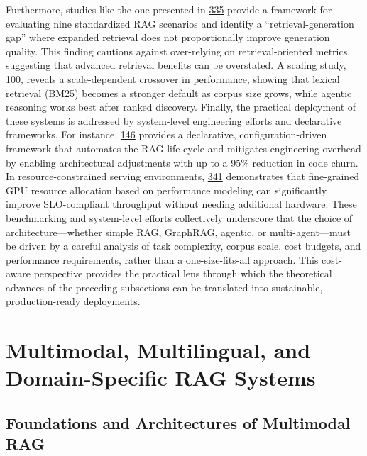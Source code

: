 \documentclass[11pt]{article}
\begin{document}
Furthermore, studies like the one presented in \href{Is\%20GraphRAG\%20Needed\%20From\%20Basic\%20RAG\%20to\%20Graph-\%20Agentic\%20Solutions\%20with\%20Context\%20Optimization}{335} provide a framework for evaluating nine standardized RAG scenarios and identify a ``retrieval-generation gap'' where expanded retrieval does not proportionally improve generation quality. This finding cautions against over-relying on retrieval-oriented metrics, suggesting that advanced retrieval benefits can be overstated. A scaling study, \href{BM25\%20Wins\%20at\%20Scale\%20A\%20Scaling\%20Study\%20of\%20Retrieval-Augmented\%20Generation\%20Paradigms}{100}, reveals a scale-dependent crossover in performance, showing that lexical retrieval (BM25) becomes a stronger default as corpus size grows, while agentic reasoning works best after ranked discovery. Finally, the practical deployment of these systems is addressed by system-level engineering efforts and declarative frameworks. For instance, \href{AutoRAGTuner\%20A\%20Declarative\%20Framework\%20for\%20Automatic\%20Optimization\%20of\%20RAG\%20Pipelines}{146} provides a declarative, configuration-driven framework that automates the RAG life cycle and mitigates engineering overhead by enabling architectural adjustments with up to a 95\% reduction in code churn. In resource-constrained serving environments, \href{VectorLiteRAG\%20Latency-Aware\%20and\%20Fine-Grained\%20Resource\%20Partitioning\%20for\%20Efficient\%20RAG}{341} demonstrates that fine-grained GPU resource allocation based on performance modeling can significantly improve SLO-compliant throughput without needing additional hardware. These benchmarking and system-level efforts collectively underscore that the choice of architecture---whether simple RAG, GraphRAG, agentic, or multi-agent---must be driven by a careful analysis of task complexity, corpus scale, cost budgets, and performance requirements, rather than a one-size-fits-all approach. This cost-aware perspective provides the practical lens through which the theoretical advances of the preceding subsections can be translated into sustainable, production-ready deployments.

\section{Multimodal, Multilingual, and Domain-Specific RAG Systems}

\subsection{Foundations and Architectures of Multimodal RAG}
\end{document}
